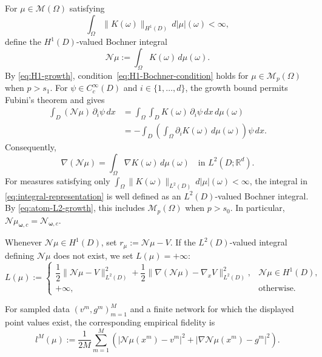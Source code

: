 \documentclass[11pt]{amsart}
\theoremstyle{definition}
\theoremstyle{remark}
\begin{document}
For $\mu\in\mathcal M(\Omega)$ satisfying
\begin{equation}
\label{eq:H1-Bochner-condition}
	\int_\Omega\|K(\omega)\|_{H^1(D)}\,d|\mu|(\omega)<\infty,
\end{equation}
define the $H^1(D)$-valued Bochner integral
\begin{equation}
\label{eq:integral-representation}
	\mathcal N\mu:=\int_\Omega K(\omega)\,d\mu(\omega).
\end{equation}
By \eqref{eq:H1-growth}, condition~\eqref{eq:H1-Bochner-condition} holds for
$\mu\in\mathcal M_p(\Omega)$ when $p>s_1$. For
$\psi\in C_c^\infty(D)$ and $i\in\{1,\ldots,d\}$, the growth bound permits
Fubini's theorem and gives
\begin{align*}
	\int_D(\mathcal N\mu)\,\partial_i\psi\,dx
	&=\int_\Omega\int_D K(\omega)\,\partial_i\psi\,dx\,d\mu(\omega)\\
	&=-\int_D\left(\int_\Omega\partial_iK(\omega)\,d\mu(\omega)\right)
	\psi\,dx.
\end{align*}
Consequently, 
\begin{equation*}
	\nabla(\mathcal N\mu)
	=\int_\Omega\nabla K(\omega)\,d\mu(\omega)
	\quad\text{in }L^2(D;\mathbb R^d).
\end{equation*}
For measures satisfying only
$\int_\Omega\|K(\omega)\|_{L^2(D)}\,d|\mu|(\omega)<\infty$, the integral in
\eqref{eq:integral-representation} is well defined as an $L^2(D)$-valued Bochner integral. By
\eqref{eq:atom-L2-growth}, this includes $\mathcal M_p(\Omega)$ when
$p>s_0$. In particular,
$\mathcal N\mu_{\boldsymbol\omega,c}=\mathcal N_{\boldsymbol\omega,c}$.

Whenever $\mathcal N\mu\in H^1(D)$, set $r_\mu:=\mathcal N\mu-V$.
If the $L^2(D)$-valued integral defining
$\mathcal N\mu$ does not exist, we set $L(\mu)=+\infty$:
\begin{equation*}
	L(\mu) :=
	\begin{cases}
	\dfrac{1}{2} \|\mathcal{N}\mu - V \|^2_{L^2(D)}
	+ \dfrac{1}{2} \|\nabla(\mathcal{N}\mu) - \nabla_x V \|_{L^2(D)}^2,
	& \mathcal{N}\mu \in H^1(D),\\[4pt]
	+\infty, & \text{otherwise.}
	\end{cases}
\end{equation*}

For sampled data $(v^m,g^m)_{m=1}^M$ and a finite network for which the
displayed point values exist, the corresponding empirical fidelity is
\begin{equation}
\label{eq:empirical-fidelity}
	l^M(\mu):=
	\frac{1}{2M}\sum_{m=1}^M
	\left(
	|\mathcal N\mu(x^m)-v^m|^2
	+|\nabla\mathcal N\mu(x^m)-g^m|^2
	\right).
\end{equation}
\end{document}
